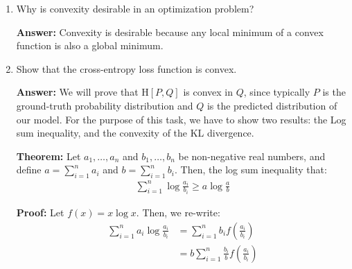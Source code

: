 \documentclass{article}
\newenvironment{QandA}{\begin{enumerate}[label=\arabic*.]}{\end{enumerate}}
\newenvironment{InnerQandA}{\begin{enumerate}[label=\roman*.]}{\end{enumerate}}
\newenvironment{answer}{\par\normalfont \textbf{Answer:}}{}
\newenvironment{theorem}{\par\normalfont \textbf{Theorem:}}{}
\newenvironment{proof}{\par\normalfont \textbf{Proof:}}{}
\newcommand{\CE}[2]{\text{H}\left[#1, #2 \right]}
\begin{document}
\begin{QandA}
\begin{InnerQandA}
        \item Why is convexity desirable in an optimization problem?
        \begin{answer}
            Convexity is desirable because any local minimum of a convex function is also a global minimum.
        \end{answer}

        \item Show that the cross-entropy loss function is convex.
        \begin{answer}
            We will prove that $\CE{P}{Q}$ is convex in $Q$, since typically $P$ is the ground-truth probability distribution and $Q$ is the predicted distribution of our model. For the purpose of this task, we have to show two results: the Log sum inequality, and the convexity of the KL divergence. 
            \begin{theorem}
                Let $a_1, \ldots, a_n$ and $b_1, \ldots, b_n$ be non-negative real numbers, and define $a = \sum_{i=1}^n a_i$ and $b = \sum_{i=1}^n b_i$. Then, the log sum inequality that:
                \begin{align*}
                    \sum_{i=1}^n \log \frac{a_i}{b_i} \ge a \log \frac{a}{b}
                \end{align*}
            \end{theorem}

            \begin{proof}
                Let $f(x) = x \log x$. Then, we re-write:
                \begin{align*}
                    \sum_{i=1}^n a_i \log \frac{a_i}{b_i} &= \sum_{i=1}^n b_i f \left(\frac{a_i}{b_i} \right) \\
                    &= b \sum_{i=1}^n \frac{b_i}{b} f \left( \frac{a_i}{b_i} \right)
                \end{align*}
            

\end{proof}
\end{answer}
\end{InnerQandA}
\end{QandA}
\end{document}

